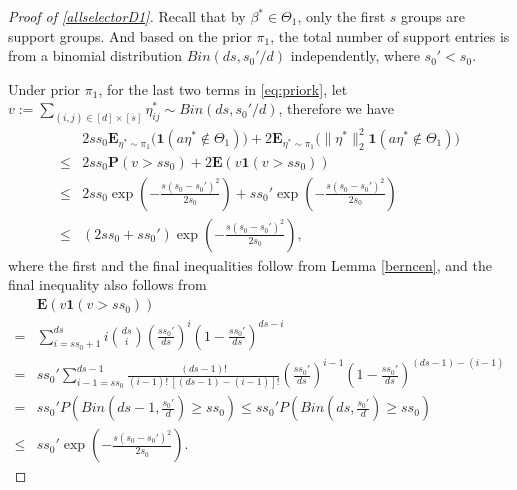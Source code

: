 \documentclass[12pt]{article}
\newtheorem{proof}{Proof}
\begin{document}
\begin{appendix}
\begin{proof}[Proof of \eqref{allselectorD1}]

Recall that by $\beta^* \in {\Theta}_1$, only the first $s$ groups are support groups.
And based on the prior $\pi_1$, the total number of support entries is from a binomial distribution $Bin(ds, s_0' / d)$ independently, where $ s_0' < s_0$. 

Under prior $\pi_1$, for the last two terms in \eqref{eq:priork}, let $v:= \sum_{(i,j)\in [d]\times [s]} \eta_{ij}^* {\sim} Bin(ds , s_0'/d)$, therefore we have 
\begin{equation}\label{eq:23term}
   \begin{aligned}
&2ss_0 \mathbf E_{\eta^* \sim \pi_1} \Big( \mathbf1( a\eta^* \notin {\Theta}_1)  \Big) + 2\mathbf E_{\eta^* \sim \pi_1}  \Big( \|\eta^*\|_2^2 \mathbf1(a\eta^* \notin {\Theta}_1) \Big)\\
\le& 2ss_0 \mathbf P \left( v > ss_0\right)
    + 2\mathbf E \left( v\mathbf1(v  >ss_0)  \right)\\
\le& 2s s_0 \exp\left(-\frac{s(s_0-s_0')^2}{2s_0}\right) 
    +ss_0' \exp\left(-\frac{s(s_0-s_0')^2}{2s_0}\right)\\
\le & (2s s_0+ ss_0') \exp\left(-\frac{s(s_0-s_0')^2}{2s_0}\right) ,
\end{aligned}
\end{equation}
where the first and the final inequalities follow from Lemma \ref{berncen}, and the final inequality also follows from 
\begin{equation*}
\begin{aligned}
&\mathbf E\left(  v \mathbf1(v > ss_0) \right)\\
=&\sum_{i=ss_0+1}^{ds} i \binom{ds}{i} \left( \frac{ss_0' }{ds} \right)^i \left(1- \frac{ss_0'}{ds} \right)^{ds-i}\\
=& ss_0' \sum_{i-1=ss_0}^{ds-1} \frac{(ds-1)!}{(i-1)!~[(ds-1)-(i-1)]!} \left( \frac{ss_0'}{ds} \right)^{i-1} \left(1- \frac{ss_0'}{ds} \right)^{(ds-1)-(i-1)}\\
=& ss_0' P\left( Bin(ds-1 , \frac{s_0'}{d} ) \ge ss_0\right)
\le s s_0' P\left( Bin(ds , \frac{s_0'}{d} ) \ge s s_0\right)\\
\le& ss_0' \exp\left(-\frac{s(s_0-s_0')^2}{2s_0}\right). 
\end{aligned}
\end{equation*}
 

\end{proof}
\end{appendix}
\end{document}
